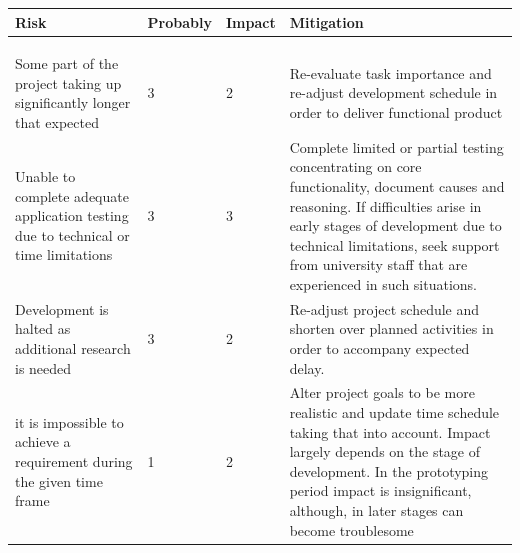 \documentclass{article}
\begin{document}
\def\riskaaaa{Some part of the project taking up significantly longer that expected}
\def \probabilityaaaa {3}
\def \impactaaaa {2}
\def \mitigationaaaa {Re-evaluate task importance and re-adjust development schedule in order to deliver functional product }

\def\riskaaaaa{Unable to complete adequate application testing due to technical or time limitations}
\def \probabilityaaaaa {3}
\def \impactaaaaa {3}
\def \mitigationaaaaa {Complete limited or partial testing concentrating on core functionality, document causes and reasoning. If difficulties arise in early stages of development  due to technical limitations, seek support from university staff that are experienced in such situations. }

\def\riskaaaaaa{Development is halted as additional research is needed}
\def \probabilityaaaaaa {3}
\def \impactaaaaaaa {2}
\def \mitigationaaaaaa {Re-adjust project schedule and shorten over planned activities in order to accompany expected delay.}


\def\riskaaaaaaa{it is impossible to achieve a requirement during the given time frame}
\def \probabilityaaaaaaa {1}
\def \impactaaaaaa {2}
\def \mitigationaaaaaaa {Alter project goals to be more realistic and update time schedule taking that into account. Impact largely depends on the stage of development. In the prototyping period impact is insignificant, although, in later stages can become troublesome}


\begin{center}
	\begin{tabular}{ |m{5cm}|m{2cm}|m{1cm}|m{6cm}| } 
		\hline
		Risk & Probably & Impact & Mitigation \\ 
		\hline
		\riska & \probabilitya & \impacta & \mitigationa \\ 
		\hline
		\riskaa & \probabilityaa & \impactaa & \mitigationaa \\ 
		\hline
		\riskaaa & \probabilityaaa & \impactaaa & \mitigationaaa \\ 
		\hline
		\riskaaaa & \probabilityaaaa & \impactaaaa & \mitigationaaaa \\ 
		\hline
		\riskaaaaa & \probabilityaaaaa & \impactaaaaa & \mitigationaaaaa \\ 
		\hline
		\riskaaaaaa & \probabilityaaaaaa & \impactaaaaaa & \mitigationaaaaaa \\ 
		\hline
		\riskaaaaaaa & \probabilityaaaaaaa & \impactaaaaaaa & \mitigationaaaaaaa \\ 
		\hline
	\end{tabular}
\end{center}


\end{document}
